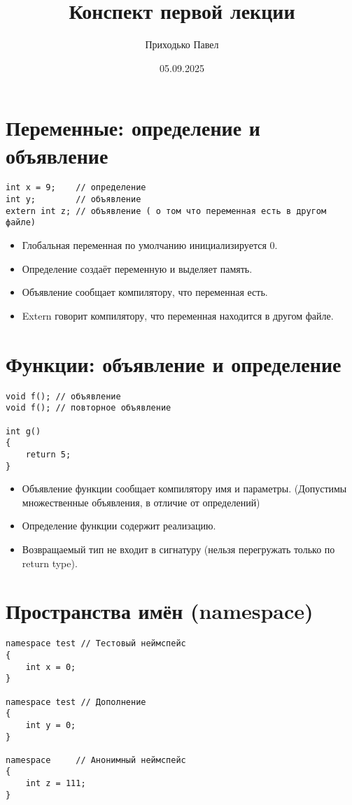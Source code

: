 \documentclass[10pt,a4paper]{article}
\title{Конспект первой лекции}
\author{Приходько Павел}
\date{05.09.2025}
\begin{document}
\maketitle

\section{Переменные: определение и объявление}
\begin{lstlisting}
int x = 9;    // определение
int y;        // объявление
extern int z; // объявление ( o том что переменная есть в другом файле)
\end{lstlisting}

\begin{itemize}
  \item Глобальная переменная по умолчанию инициализируется 0.
  \item Определение создаёт переменную и выделяет память.
  \item Объявление сообщает компилятору, что переменная есть.
  \item Extern говорит компилятору, что переменная находится в другом файле.
\end{itemize}

\section{Функции: объявление и определение}
\begin{lstlisting}
void f(); // объявление
void f(); // повторное объявление

int g()
{
    return 5;
}
\end{lstlisting}

\begin{itemize}
  \item Объявление функции сообщает компилятору имя и параметры. (Допустимы множественные объявления, в отличие от определений)
  \item Определение функции содержит реализацию.
  \item Возвращаемый тип не входит в сигнатуру (нельзя перегружать только по return type).
\end{itemize}

\section{Пространства имён (namespace)}
\begin{lstlisting}
namespace test // Тестовый неймспейс
{
    int x = 0;
}

namespace test // Дополнение
{
    int y = 0;
}

namespace     // Анонимный неймспейс
{
    int z = 111;
}
\end{lstlisting}
\end{document}

